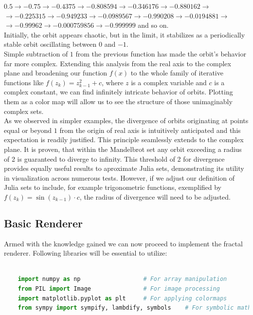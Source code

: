 \documentclass{article}
\begin{document}
$0.5 \rightarrow -0.75 \rightarrow -0.4375 \rightarrow -0.808594 \rightarrow -0.346176 \rightarrow -0.880162 \rightarrow$ \\
$\rightarrow -0.225315 \rightarrow -0.949233 \rightarrow -0.0989567 \rightarrow -0.990208 \rightarrow -0.0194881 \rightarrow$ \\ $\rightarrow -0.99962 \rightarrow -0.000759856 \rightarrow -0.999999$ and so on.
\\
Initially, the orbit appears chaotic, but in the limit, it stabilizes as a periodically stable orbit oscillating between $0$ and $-1$.
\\
Simple subtraction of $1$ from the previous function has made the orbit's behavior far more complex. Extending this analysis from the real axis to the complex plane and broadening our function $f(x)$ to the whole family of iterative functions like $f(z_k) = z_{k-1}^2 + c$, where $z$ is a complex variable and $c$ is a complex constant, we can find infinitely intricate behavior of orbits. Plotting them as a color map will allow us to see the structure of those unimaginably complex sets.
\\[1\baselineskip]
As we observed in simpler examples, the divergence of orbits originating at points equal or beyond $1$ from the origin of real axis is intuitively anticipated and this expectation is readily justified. This principle seamlessly extends to the complex plane. It is proven, that within the Mandelbrot set any orbit exceeding a radius of 2 is guaranteed to diverge to infinity. This threshold of 2 for divergence provides equally useful results to aproximate Julia sets, demonstrating its utility in visualization across numerous tests. However, if we adjust our definition of Julia sets to include, for example trigonometric functions, exemplified by $f(z_k) = \sin(z_{k-1}) \cdot c$, the radius of divergence will need to be adjusted.

\pagebreak
\subsection{Basic Renderer}

Armed with the knowledge gained we can now proceed to implement the fractal renderer. Following libraries will be essential to utilize:

\begin{lstlisting}[language=Python, caption=Essential libraries]
	
	import numpy as np					# For array manipulation
	from PIL import Image   			# For image processing
	import matplotlib.pyplot as plt		# For applying colormaps
	from sympy import sympify, lambdify, symbols    # For symbolic mathematics
	
\end{lstlisting}
\end{document}
